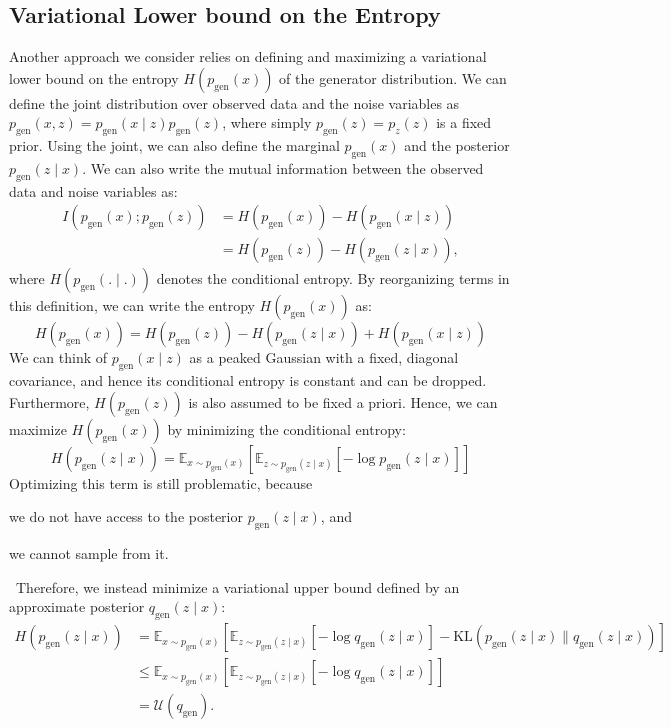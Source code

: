 \documentclass[a4paper]{article}
\newcommand{\pg}{p_\text{gen}}
\newcommand{\pz}{p_{z}}
\newcommand{\qg}{q_\text{gen}}
\begin{document}
\subsection{Variational Lower bound on the Entropy}
Another approach we consider relies on defining and maximizing a variational lower bound on the entropy $H(\pg(x))$ of the generator distribution.
We can define the joint distribution over observed data and the noise variables as $\pg(x,z)=\pg(x\mid z)\pg(z)$, where simply $\pg(z)=\pz(z)$ is a fixed prior. Using the joint, we can also define the marginal $\pg(x)$ and the posterior $\pg(z\mid x)$.
We can also write the mutual information between the observed data and noise variables as:
\begin{equation}
\begin{aligned}
I(\pg(x);\pg(z)) &= H(\pg(x))-H(\pg(x\mid z))\\
&= H(\pg(z))-H(\pg(z\mid x)),
\end{aligned}
\end{equation}
where $H(\pg(.\mid .))$ denotes the conditional entropy. By reorganizing terms in this definition, we can write the entropy $H(\pg(x))$ as:
\begin{equation}
H(\pg(x))=H(\pg(z))-H(\pg(z\mid x))+H(\pg(x\mid z))
\end{equation}
We can think of $\pg (x\mid z)$ as a peaked Gaussian with a fixed, diagonal covariance, and hence its conditional entropy is constant and can be dropped. Furthermore, $H(\pg(z))$ is also assumed to be fixed a priori. Hence, we can maximize $H(\pg(x))$ by minimizing the conditional entropy:
\begin{equation}
H(\pg(z\mid x))=\mathbb{E}_{x\sim \pg (x)}\left[\mathbb{E}_{z\sim \pg(z\mid x)}\left[-\log \pg(z\mid x)\right]\right]
\end{equation}
Optimizing this term is still problematic, because
\begin{inlinelist}
\item we do not have access to the posterior $\pg(z\mid x)$, and
\item we cannot sample from it.
\end{inlinelist}~Therefore, we instead minimize a variational upper bound defined by an approximate posterior $\qg(z\mid x)$:
\begin{equation}
\begin{aligned}
H(\pg(z\mid x)) &=  \mathbb{E}_{x\sim \pg(x)}\left[\mathbb{E}_{z\sim \pg(z\mid x)}\left[-\log \qg(z\mid x)\right] - 
\textrm{KL}(\pg(z\mid x)\| \qg(z\mid x))\right] \\
&\leq  \mathbb{E}_{x\sim \pg(x)}\left[\mathbb{E}_{z\sim \pg(z\mid x)}\left[-\log \qg(z\mid x)\right]\right] \\
&= \mathcal{U}(\qg).
\end{aligned}
\end{equation}
\end{document}
